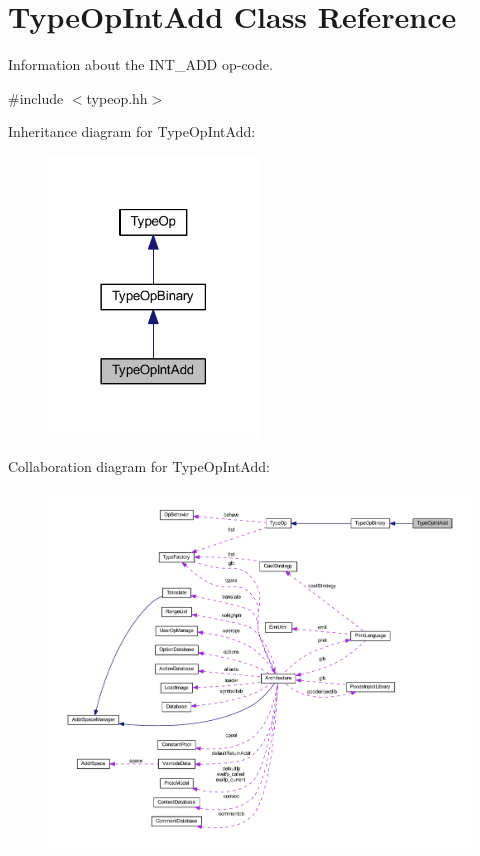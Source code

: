 \hypertarget{class_type_op_int_add}{}\section{Type\+Op\+Int\+Add Class Reference}
\label{class_type_op_int_add}


Information about the I\+N\+T\+\_\+\+A\+DD op-\/code.  




{\ttfamily \#include $<$typeop.\+hh$>$}



Inheritance diagram for Type\+Op\+Int\+Add\+:
\nopagebreak
\begin{figure}[H]
\begin{center}
\leavevmode
\includegraphics[width=158pt]{class_type_op_int_add__inherit__graph}
\end{center}
\end{figure}


Collaboration diagram for Type\+Op\+Int\+Add\+:
\nopagebreak
\begin{figure}[H]
\begin{center}
\leavevmode
\includegraphics[width=350pt]{class_type_op_int_add__coll__graph}
\end{center}
\end{figure}
